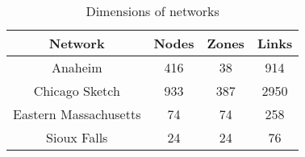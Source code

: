 \begin{table}[h!]
\caption{Dimensions of networks}
\label{table:networksdim}
\center
\begin{tabular}{|c|c|c|c|}
\hline
Network	&	Nodes	&	Zones	&	Links\\
\hline
Anaheim		&	416	&	38	&	914\\	
Chicago Sketch	&	933	&	387	&	2950\\
Eastern Massachusetts	&	74	&	74	&	258\\	
Sioux Falls	&	24	&	24	&	76\\
\hline
\end{tabular}
\end{table}
